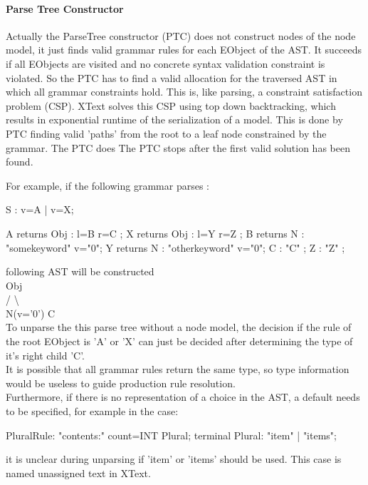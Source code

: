 \paragraph{Parse Tree Constructor}  \label{xtxt:ptc}
Actually the ParseTree constructor (PTC) does not construct nodes of the node model, it just finds valid grammar rules for each EObject of the AST. It succeeds if all EObjects are visited and no concrete syntax validation constraint is violated. So the PTC has to find a valid allocation for the traversed AST in which all grammar constraints hold.  This is, like parsing, a constraint satisfaction problem (CSP). XText solves this CSP  using top down backtracking, which results in exponential runtime of the serialization of a model. This is done by PTC finding valid 'paths' from the root to a leaf node constrained by the grammar. The PTC does The PTC stops after the first valid solution has been found. 

For example, if the following grammar parses :
\begin{xtxt}
S  	:  	v=A 
	| 	v=X;

A returns Obj	: 	l=B r=C   ;
X returns Obj	: 	l=Y r=Z   ;
B returns N  	:  	"somekeyword" 	v="0";
Y returns N  	: 	"otherkeyword" 	v="0";
C 		:  	 "C" ;
Z 		: 	 "Z" ;
\end{xtxt}
following AST will be constructed  \\ 
      Obj			\\
     /   \textbackslash		\\
N(v='0')   C	\\
To unparse the this parse tree without a node model, the decision if the rule of the root EObject is 'A' or 'X' can just be decided after determining the type of it's right child 'C'. \\

It is possible that all grammar rules return the same type, so type information would be useless to guide production rule resolution.\\
Furthermore, if there is no representation of a choice in the AST, a default needs to be specified, for example in the case: 
\begin{xtxt}
PluralRule: "contents:" count=INT Plural;
terminal Plural: "item" | "items";
\end{xtxt}
it is unclear during unparsing if 'item' or 'items' should be used. This case is named unassigned text in XText.

